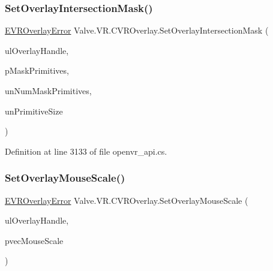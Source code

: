 \mbox{\label{class_valve_1_1_v_r_1_1_c_v_r_overlay_ad46d3895589f3577b462e07df50713a4}} 
\subsubsection{\texorpdfstring{SetOverlayIntersectionMask()}{SetOverlayIntersectionMask()}}
{\footnotesize\ttfamily \mbox{\hyperlink{namespace_valve_1_1_v_r_aaee5c5144f42b7969d45b854f51b0c18}{E\+V\+R\+Overlay\+Error}} Valve.\+V\+R.\+C\+V\+R\+Overlay.\+Set\+Overlay\+Intersection\+Mask (\begin{DoxyParamCaption}\item[{ulong}]{ul\+Overlay\+Handle,  }\item[{ref \mbox{\hyperlink{struct_valve_1_1_v_r_1_1_v_r_overlay_intersection_mask_primitive__t}{V\+R\+Overlay\+Intersection\+Mask\+Primitive\+\_\+t}}}]{p\+Mask\+Primitives,  }\item[{uint}]{un\+Num\+Mask\+Primitives,  }\item[{uint}]{un\+Primitive\+Size }\end{DoxyParamCaption})}



Definition at line 3133 of file openvr\+\_\+api.\+cs.

\mbox{\label{class_valve_1_1_v_r_1_1_c_v_r_overlay_a2ad8de82b2f52064ad5e765225869dd7}} 
\subsubsection{\texorpdfstring{SetOverlayMouseScale()}{SetOverlayMouseScale()}}
{\footnotesize\ttfamily \mbox{\hyperlink{namespace_valve_1_1_v_r_aaee5c5144f42b7969d45b854f51b0c18}{E\+V\+R\+Overlay\+Error}} Valve.\+V\+R.\+C\+V\+R\+Overlay.\+Set\+Overlay\+Mouse\+Scale (\begin{DoxyParamCaption}\item[{ulong}]{ul\+Overlay\+Handle,  }\item[{ref \mbox{\hyperlink{struct_valve_1_1_v_r_1_1_hmd_vector2__t}{Hmd\+Vector2\+\_\+t}}}]{pvec\+Mouse\+Scale }\end{DoxyParamCaption})}



